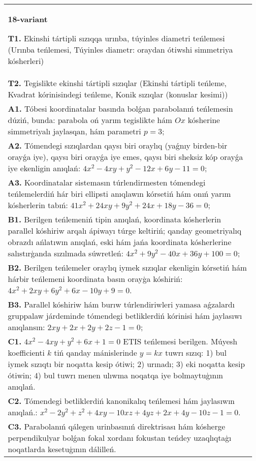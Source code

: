 \documentclass{article}
\begin{document}
\begin{tabular}{m{17cm}}
\textbf{18-variant}
\newline

\textbf{T1.} Ekinshi tártipli sızıqqa urınba, túyinles diametri teńlemesi (Urınba teńlemesi, Túyinles diametr: oraydan ótiwshi simmetriya kósherleri) \\
\textbf{T2.} Tegislikte ekinshi tártipli sızıqlar (Ekinshi tártipli teńleme, Kvadrat kórinisindegi teńleme, Konik sızıqlar (konuslar kesimi)) \\
\textbf{A1.} Tóbesi koordinatalar basında bolǵan parabolanıń teńlemesin dúziń, bunda: parabola oń yarım tegislikte hám $Ox$ kósherine simmetriyalı jaylasqan, hám parametri $p=3$; \\
\textbf{A2.} Tómendegi sızıqlardan qaysı biri oraylıq (yaǵnıy birden-bir orayǵa iye), qaysı biri orayǵa iye emes, qaysı biri sheksiz kóp orayǵa iye ekenligin anıqlań: $4 x^2-4 x y+y^2-12 x+6 y-11=0$; \\
\textbf{A3.} Koordinatalar sistemasın túrlendirmesten tómendegi teńlemelerdiń hár biri ellipsti anıqlawın kórsetiń hám onıń yarım kósherlerin tabıń: $41 x^2+24 x y+9 y^2+24 x+18 y-36=0$; \\
\textbf{B1.} Berilgen teńlemeniń tipin anıqlań, koordinata kósherlerin parallel kóshiriw arqalı ápiwayı túrge keltiriń; qanday geometriyalıq obrazdı ańlatıwın anıqlań, eski hám jańa koordinata kósherlerine salıstırģanda sızılmada súwretleń: $4 x^2+9 y^2-40 x+36 y+100=0$; \\
\textbf{B2.} Berilgen teńlemeler oraylıq iymek sızıqlar ekenligin kórsetiń hám hárbir teńlemeni koordinata basın orayģa kóshiriń:  $4 x^2+2 x y+6 y^2+6 x-10 y+9=0$. \\
\textbf{B3.} Parallel kóshiriw hám burıw túrlendiriwleri yamasa aǵzalardı gruppalaw járdeminde tómendegi betliklerdiń kórinisi hám jaylasıwı anıqlansın: $2 x y+2 x+2 y+2 z-1=0$; \\
\textbf{C1.} $4 x^2-4 x y+y^2+6 x+1=0$ ETIS teńlemesi berilgen. Múyesh koefficienti $k$ tiń qanday mánislerinde $y=kx$ tuwrı sızıq: 1) bul iymek sızıqtı bir noqatta kesip ótiwi; 2) urınadı; 3) eki noqatta kesip ótiwin; 4) bul tuwrı menen ulıwma noqatqa iye bolmaytuģının anıqlań. \\
\textbf{C2.} Tómendegi betliklerdiń kanonikalıq teńlemesi hám jaylasıwın anıqlań.: $x^2-2 y^2+z^2+4 x y-10 x z+4 y z+2 x+4 y-10 z-1=0$. \\
\textbf{C3.} Parabolanıń qálegen urinbasınıń direktrisası hám kósherge perpendikulyar bolǵan fokal xordanı fokustan teńdey uzaqlıqtaģı noqatlarda kesetuģının dálilleń. \\

\end{tabular}
\vspace{1cm}
\end{document}
